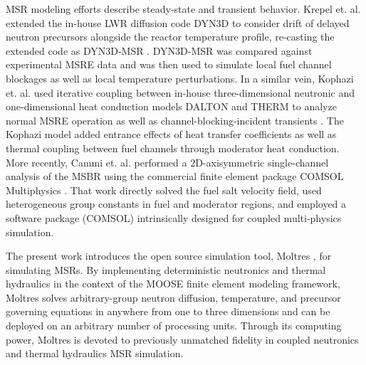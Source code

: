 \documentclass{article}
\begin{document}
\gls{MSR} modeling efforts describe steady-state and
transient behavior. Krepel et. al. extended the in-house \gls{LWR}
diffusion code DYN3D to consider drift of delayed neutron precursors alongside
the reactor temperature profile, re-casting the extended code as
DYN3D-MSR \cite{krepel_dyn3d-msr_2007}. DYN3D-MSR was compared against
experimental \gls{MSRE} data and was then used to simulate local fuel channel
blockages as well as local temperature perturbations. In a similar vein, Kophazi
et. al. used iterative coupling between in-house three-dimensional neutronic and
one-dimensional heat conduction models DALTON and THERM to analyze normal 
\gls{MSRE} operation as well as channel-blocking-incident
transients \cite{kophazi_development_2009}. The Kophazi model added entrance 
effects of heat transfer coefficients as well as thermal
coupling between fuel channels through moderator heat conduction. More recently,
Cammi et. al. performed a 2D-axisymmetric single-channel analysis of the
\gls{MSBR} using the commercial finite element package COMSOL
Multiphysics \cite{cammi_multi-physics_2011}. That work directly solved the 
fuel salt velocity field, used heterogeneous group constants
in fuel and moderator regions, and employed a software package (COMSOL)
intrinsically designed for coupled multi-physics simulation.

The present work introduces the open source simulation tool, Moltres
\cite{lindsay_arfc/moltres_nodate}, for simulating \glspl{MSR}.  By implementing
deterministic neutronics and thermal hydraulics in the context of the
\gls{MOOSE} finite element modeling framework, Moltres solves arbitrary-group
neutron diffusion, temperature, and precursor governing equations in anywhere
from one to three dimensions and can be deployed on an arbitrary number of
processing units. Through its computing power, Moltres is devoted to previously
unmatched fidelity in coupled neutronics and thermal hydraulics \gls{MSR}
simulation.
\end{document}
